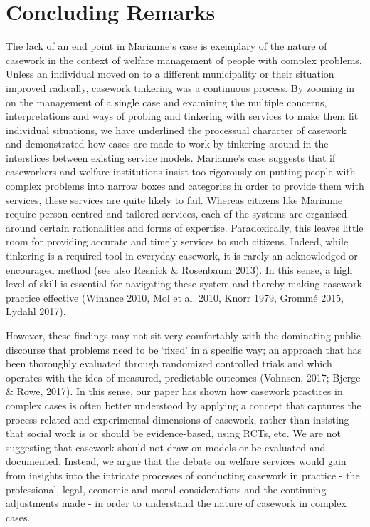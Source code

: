 \chapter{Concluding Remarks}
The lack of an end point in Marianne’s case is exemplary of the nature of casework in the context of welfare management of people with complex problems. Unless an individual moved on to a different municipality or their situation improved radically, casework tinkering was a continuous process. By zooming in on the management of a single case and examining the multiple concerns, interpretations and ways of probing and tinkering with services to make them fit individual situations, we have underlined the processual character of casework and demonstrated how cases are made to work by tinkering around in the interstices between existing service models. Marianne’s case suggests that if caseworkers and welfare institutions insist too rigorously on putting people with complex problems into narrow boxes and categories in order to provide them with services, these services are quite likely to fail. Whereas citizens like Marianne require person-centred and tailored services, each of the systems are organised around certain rationalities and forms of expertise. Paradoxically, this leaves little room for providing accurate and timely services to such citizens. Indeed, while tinkering is a required tool in everyday casework, it is rarely an acknowledged or encouraged method (see also Resnick \& Rosenbaum 2013). In this sense, a high level of skill is essential for navigating these system and thereby making casework practice effective (Winance 2010, Mol et al. 2010, Knorr 1979, Grommé 2015, Lydahl 2017).
\par
However, these findings may not sit very comfortably with the dominating public discourse that problems need to be ‘fixed’ in a specific way; an approach that has been thoroughly evaluated through randomized controlled trials and which operates with the idea of measured, predictable outcomes (Vohnsen, 2017; Bjerge \& Rowe, 2017). In this sense, our paper has shown how casework practices in complex cases is often better understood by applying a concept that captures the process-related and experimental dimensions of casework, rather than insisting that social work is or should be evidence-based, using RCTs, etc. We are not suggesting that casework should not draw on models or be evaluated and documented. Instead, we argue that the debate on welfare services would gain from insights into the intricate processes of conducting casework in practice - the professional, legal, economic and moral considerations and the continuing adjustments made - in order to understand the nature of casework in complex cases.
